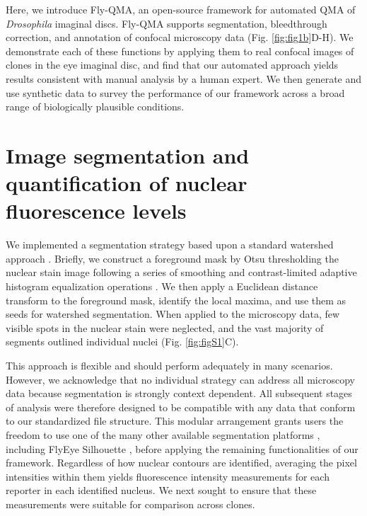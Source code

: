Here, we introduce Fly-QMA, an open-source framework for automated QMA of \textit{Drosophila} imaginal discs. Fly-QMA supports segmentation, bleedthrough correction, and annotation of confocal microscopy data (Fig. \ref{fig:fig1b}D-H). We demonstrate each of these functions by applying them to real confocal images of clones in the eye imaginal disc, and find that our automated approach yields results consistent with manual analysis by a human expert. We then generate and use synthetic data to survey the performance of our framework across a broad range of biologically plausible conditions.



\section{Image segmentation and quantification of nuclear fluorescence levels}
\label{ch:segmentation}

We implemented a segmentation strategy based upon a standard watershed approach \cite{VanderWalt2014}. Briefly, we construct a foreground mask by Otsu thresholding the nuclear stain image following a series of smoothing and contrast-limited adaptive histogram equalization operations \cite{NobuyukiOtsu1979,VanderWalt2014}. We then apply a Euclidean distance transform to the foreground mask, identify the local maxima, and use them as seeds for watershed segmentation. When applied to the microscopy data, few visible spots in the nuclear stain were neglected, and the vast majority of segments outlined individual nuclei (Fig. \ref{fig:figS1}C).

This approach is flexible and should perform adequately in many scenarios. However, we acknowledge that no individual strategy can address all microscopy data because segmentation is strongly context dependent. All subsequent stages of analysis were therefore designed to be compatible with any data that conform to our standardized file structure. This modular arrangement grants users the freedom to use one of the many other available segmentation platforms \cite{Bugarski2014}, including FlyEye Silhouette \cite{Pelaez2015a}, before applying the remaining functionalities of our framework. Regardless of how nuclear contours are identified, averaging the pixel intensities within them yields fluorescence intensity measurements for each reporter in each identified nucleus. We next sought to ensure that these measurements were suitable for comparison across clones.


